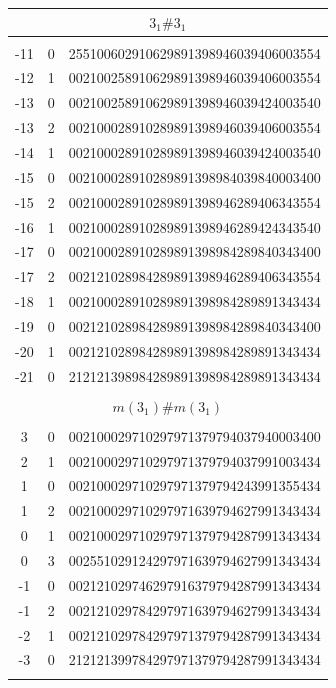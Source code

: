 \documentclass{article}
\begin{document}
\begin{supertabular}[h]{c c r}
\hline
{} \\
\hline \\[-3pt]
-11   & 0  & 255100602910629891398946039406003554  \\
-12   & 1  & 002100258910629891398946039406003554  \\
-13   & 0  & 002100258910629891398946039424003540  \\
-13   & 2  & 002100028910289891398946039406003554  \\
-14   & 1  & 002100028910289891398946039424003540  \\
-15   & 0  & 002100028910289891398984039840003400  \\
-15   & 2  & 002100028910289891398946289406343554  \\
-16   & 1  & 002100028910289891398946289424343540  \\
-17   & 0  & 002100028910289891398984289840343400  \\
-17   & 2  & 002121028984289891398946289406343554  \\
-18   & 1  & 002100028910289891398984289891343434  \\
-19   & 0  & 002121028984289891398984289840343400  \\
-20   & 1  & 002121028984289891398984289891343434  \\
-21   & 0  & 212121398984289891398984289891343434  \\
\\[-5pt]

\hline 
{}                  \\
\hline \\[-3pt]
3     & 0  & 002100029710297971379794037940003400  \\
2     & 1  & 002100029710297971379794037991003434  \\
1     & 0  & 002100029710297971379794243991355434  \\
1     & 2  & 002100029710297971639794627991343434  \\
0     & 1  & 002100029710297971379794287991343434  \\
0     & 3  & 002551029124297971639794627991343434  \\
-1    & 0  & 002121029746297916379794287991343434  \\
-1    & 2  & 002121029784297971639794627991343434  \\
-2    & 1  & 002121029784297971379794287991343434  \\
-3    & 0  & 212121399784297971379794287991343434  \\
\\[-5pt]


\end{supertabular}
\end{document}
